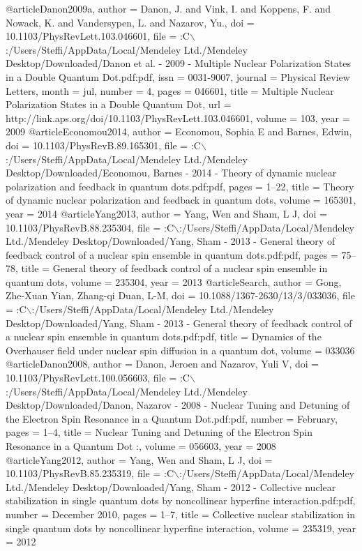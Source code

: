 @article{Danon2009a,
author = {Danon, J. and Vink, I. and Koppens, F. and Nowack, K. and Vandersypen, L. and Nazarov, Yu.},
doi = {10.1103/PhysRevLett.103.046601},
file = {:C$\backslash$:/Users/Steffi/AppData/Local/Mendeley Ltd./Mendeley Desktop/Downloaded/Danon et al. - 2009 - Multiple Nuclear Polarization States in a Double Quantum Dot.pdf:pdf},
issn = {0031-9007},
journal = {Physical Review Letters},
month = {jul},
number = {4},
pages = {046601},
title = {{Multiple Nuclear Polarization States in a Double Quantum Dot}},
url = {http://link.aps.org/doi/10.1103/PhysRevLett.103.046601},
volume = {103},
year = {2009}
}
@article{Economou2014,
author = {Economou, Sophia E and Barnes, Edwin},
doi = {10.1103/PhysRevB.89.165301},
file = {:C$\backslash$:/Users/Steffi/AppData/Local/Mendeley Ltd./Mendeley Desktop/Downloaded/Economou, Barnes - 2014 - Theory of dynamic nuclear polarization and feedback in quantum dots.pdf:pdf},
pages = {1--22},
title = {{Theory of dynamic nuclear polarization and feedback in quantum dots}},
volume = {165301},
year = {2014}
}
@article{Yang2013,
author = {Yang, Wen and Sham, L J},
doi = {10.1103/PhysRevB.88.235304},
file = {:C$\backslash$:/Users/Steffi/AppData/Local/Mendeley Ltd./Mendeley Desktop/Downloaded/Yang, Sham - 2013 - General theory of feedback control of a nuclear spin ensemble in quantum dots.pdf:pdf},
pages = {75--78},
title = {{General theory of feedback control of a nuclear spin ensemble in quantum dots}},
volume = {235304},
year = {2013}
}
@article{Search,
author = {{Gong, Zhe-Xuan Yian, Zhang-qi Duan}, L-M},
doi = {10.1088/1367-2630/13/3/033036},
file = {:C$\backslash$:/Users/Steffi/AppData/Local/Mendeley Ltd./Mendeley Desktop/Downloaded/Yang, Sham - 2013 - General theory of feedback control of a nuclear spin ensemble in quantum dots.pdf:pdf},
title = {{Dynamics of the Overhauser field under nuclear spin diffusion in a quantum dot}},
volume = {033036}
}
@article{Danon2008,
author = {Danon, Jeroen and Nazarov, Yuli V},
doi = {10.1103/PhysRevLett.100.056603},
file = {:C$\backslash$:/Users/Steffi/AppData/Local/Mendeley Ltd./Mendeley Desktop/Downloaded/Danon, Nazarov - 2008 - Nuclear Tuning and Detuning of the Electron Spin Resonance in a Quantum Dot.pdf:pdf},
number = {February},
pages = {1--4},
title = {{Nuclear Tuning and Detuning of the Electron Spin Resonance in a Quantum Dot :}},
volume = {056603},
year = {2008}
}
@article{Yang2012,
author = {Yang, Wen and Sham, L J},
doi = {10.1103/PhysRevB.85.235319},
file = {:C$\backslash$:/Users/Steffi/AppData/Local/Mendeley Ltd./Mendeley Desktop/Downloaded/Yang, Sham - 2012 - Collective nuclear stabilization in single quantum dots by noncollinear hyperfine interaction.pdf:pdf},
number = {December 2010},
pages = {1--7},
title = {{Collective nuclear stabilization in single quantum dots by noncollinear hyperfine interaction}},
volume = {235319},
year = {2012}
}
